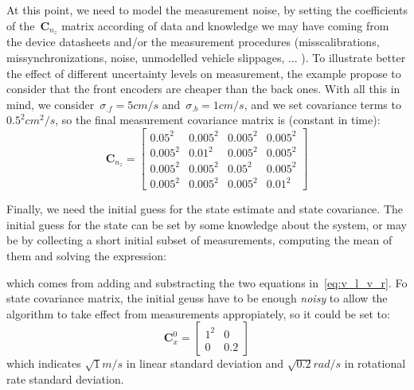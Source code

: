 At this point, we need to model the measurement noise, by setting the coefficients of the~$\mathbf{C}_{n_z}$ matrix according of data and knowledge we may have coming from the device datasheets and/or the measurement procedures (misscalibrations, missynchronizations, noise, unmodelled vehicle slippages, ... ). To illustrate better the effect of different uncertainty levels on measurement, the example propose to consider that the front encoders are cheaper than the back ones. With all this in mind, we consider~$\sigma_{.f}=5cm/s$ and~$\sigma_{.b}=1cm/s$, and we set covariance terms to $0.5^2 cm^2/s$, so the final measurement covariance matrix is (constant in time):
\begin{equation}
 \mathbf{C}_{n_z} = 
 \left[
 \begin{array}{cccc}
  0.05^2 & 0.005^2 & 0.005^2 & 0.005^2 \\
  0.005^2& 0.01^2  & 0.005^2 & 0.005^2 \\
  0.005^2& 0.005^2 & 0.05^2  & 0.005^2 \\
  0.005^2& 0.005^2 & 0.005^2 & 0.01^2
 \end{array}
 \right]
\end{equation}

Finally, we need the initial guess for the state estimate and state covariance. The initial guess for the state can be set by some knowledge about the system, or may be by collecting a short initial subset of measurements, computing the mean of them and solving the expression:

which comes from adding and substracting the two equations in~\ref{eq:v_l_v_r}. Fo state covariance matrix, the initial geuss have to be enough \textit{noisy} to allow the algorithm to take effect from measurements appropiately, so it could be set to: 
\begin{equation}
 \mathbf{C}^0_{x} = 
 \left[
 \begin{array}{cc}
  1^2 & 0 \\
  0 & 0.2
  \end{array}
 \right]
\end{equation}
which indicates $\sqrt{1}m/s$ in linear standard deviation and $\sqrt{0.2}rad/s$ in rotational rate standard deviation. 

